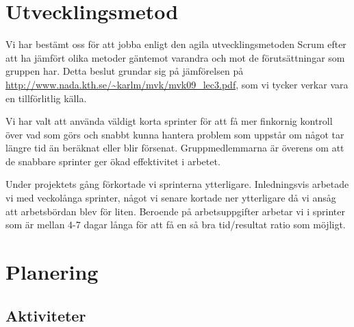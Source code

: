\documentclass[a4paper,11pt]{article}
\begin{document}
\section{Utvecklingsmetod}

  Vi har bestämt oss för att jobba enligt den agila utvecklingsmetoden Scrum
  efter att ha jämfört olika metoder gäntemot varandra och mot de
  förutsättningar som gruppen har.  Detta beslut grundar sig på jämförelsen på
  \url{http://www.nada.kth.se/~karlm/mvk/mvk09_lec3.pdf}, som vi tycker verkar
  vara en tillförlitlig källa.

  Vi har valt att använda väldigt korta sprinter för att få mer finkornig
  kontroll över vad som görs och snabbt kunna hantera problem som uppstår om
  något tar längre tid än beräknat eller blir försenat.  Gruppmedlemmarna är
  överens om att de snabbare sprinter ger ökad effektivitet i arbetet.

  Under projektets gång förkortade vi sprinterna ytterligare. Inledningsvis
  arbetade vi med veckolånga sprinter, något vi senare kortade ner ytterligare
  då vi ansåg att arbetsbördan blev för liten. Beroende på arbetsuppgifter
  arbetar vi i sprinter som är mellan 4-7 dagar långa för att få en så bra
  tid/resultat ratio som möjligt.

\section{Planering}

\subsection{Aktiviteter}
\end{document}
